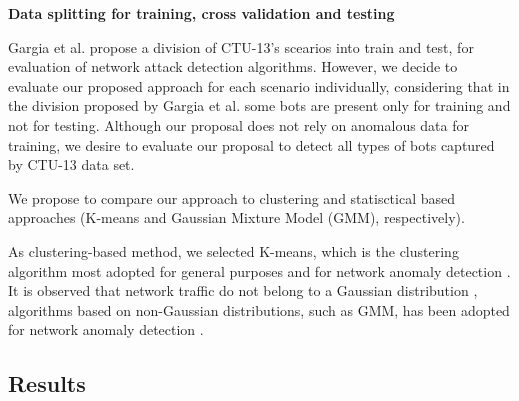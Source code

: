 \documentclass[review]{elsarticle}
\begin{document}
\textbf{Data splitting for training, cross validation and testing}

	Gargia et al. \cite{garcia2014empirical} propose a division of CTU-13's scearios into train and test, for evaluation of network attack detection algorithms. 
	However, we decide to evaluate our proposed approach for each scenario individually, considering that in the division proposed by Gargia et al. some bots are present only for training and not for testing. 
	Although our proposal does not rely on anomalous data for training, we desire to evaluate our proposal to detect all types of bots captured by CTU-13 data set.


We propose to compare our approach to clustering and statisctical based approaches (K-means and Gaussian Mixture Model (GMM), respectively).

	As clustering-based method, we selected K-means, which is the clustering algorithm most adopted for general purposes and for network anomaly detection \cite{gaddam2007k,moustafa2019holistic}.
	It is observed that network traffic do not belong to a Gaussian distribution \cite{benson2010network,moustafa2019holistic}, algorithms based on non-Gaussian distributions, such as GMM, has been adopted for network anomaly detection \cite{moustafa2019holistic}.


\subsection{Results}
\label{sec:results}
\end{document}
